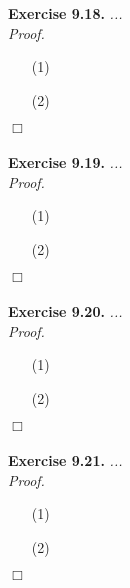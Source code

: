 \documentclass{article}
\begin{document}



\textbf{Exercise 9.18.}
\emph{...} \\

\emph{Proof.}
\begin{enumerate}
\item[(1)]
\item[(2)]

\end{enumerate}
$\Box$ \\\\






\textbf{Exercise 9.19.}
\emph{...} \\

\emph{Proof.}
\begin{enumerate}
\item[(1)]
\item[(2)]

\end{enumerate}
$\Box$ \\\\






\textbf{Exercise 9.20.}
\emph{...} \\

\emph{Proof.}
\begin{enumerate}
\item[(1)]
\item[(2)]

\end{enumerate}
$\Box$ \\\\






\textbf{Exercise 9.21.}
\emph{...} \\

\emph{Proof.}
\begin{enumerate}
\item[(1)]
\item[(2)]

\end{enumerate}
$\Box$ \\\\
\end{document}

